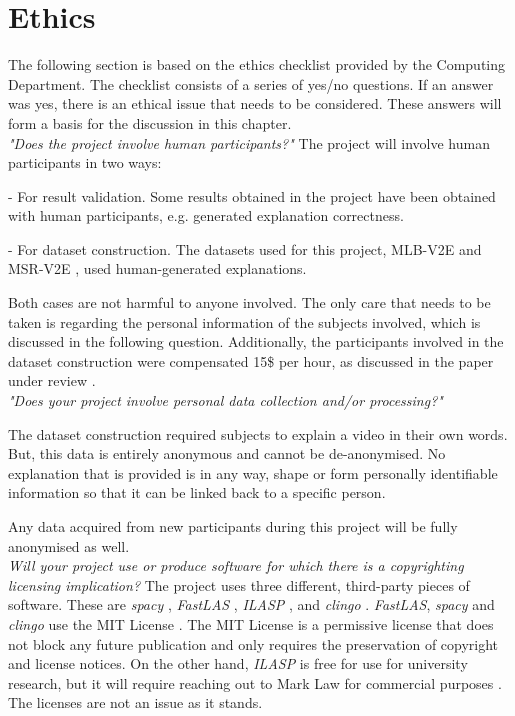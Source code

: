 \appendix
\chapter{Ethics}

The following section is based on the ethics checklist provided by the Computing Department. 
The checklist consists of a series of yes/no questions. 
If an answer was yes, there is an ethical issue that needs to be considered.
These answers will form a basis for the discussion in this chapter. \\


\emph{"Does the project involve human participants?"}
The project will involve human participants in two ways: 

    - For result validation. Some results obtained in the project have been obtained with human participants, e.g. generated explanation correctness.
    
    - For dataset construction. The datasets used for this project, MLB-V2E \cite{RefWorks:RefID:16-2021automatic} and MSR-V2E \cite{RefWorks:RefID:16-2021automatic}, used human-generated explanations.

Both cases are not harmful to anyone involved. The only care that needs to be taken is regarding the personal information of the subjects involved, which is discussed in the following question.
Additionally, the participants involved in the dataset construction were compensated 15\$ per hour, as discussed in the paper under review \cite{RefWorks:RefID:16-2021automatic}.\\

\emph{"Does your project involve personal data collection and/or processing?"}

The dataset construction required subjects to explain a video in their own words.
But, this data is entirely anonymous and cannot be de-anonymised.
No explanation that is provided is in any way, shape or form personally identifiable information so that it can be linked back to a specific person.

Any data acquired from new participants during this project will be fully anonymised as well. \\

\emph{Will your project use or produce software for which there is a copyrighting licensing implication?}
The project uses three different, third-party pieces of software.
These are \emph{spacy} \cite{RefWorks:RefID:24-spacy}, \emph{FastLAS} \cite{RefWorks:RefID:19-law2020fastlas:}, \emph{ILASP} \cite{RefWorks:RefID:18-law2020ilasp}, and \emph{clingo} \cite{RefWorks:RefID:22-clingo}.
\emph{FastLAS}, \emph{spacy} and \emph{clingo} use the MIT License \cite{RefWorks:RefID:53-mit}.
The MIT License is a permissive license that does not block any future publication and only requires the preservation of copyright and license notices.
On the other hand, \emph{ILASP} is free for use for university research, but it will require reaching out to Mark Law for commercial purposes \cite{RefWorks:RefID:54-ilasp}.
The licenses are not an issue as it stands. \\


